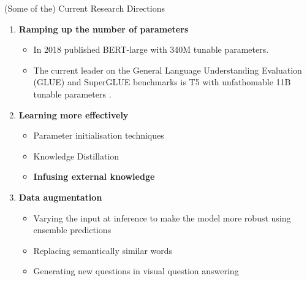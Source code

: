 \begin{frame}{(Some of the) Current Research Directions} 
\begin{enumerate}
    \item \textbf{Ramping up the number of parameters }
    \begin{itemize}
        \item In 2018 \cite{Devlin2018BERT:Understanding} published BERT-large with 340M tunable parameters. 
        \item The current leader on the General Language Understanding Evaluation (GLUE) and SuperGLUE benchmarks is T5 with unfathomable 11B tunable parameters \cite{Raffel2019ExploringTransformer}. 
    \end{itemize}
    \item \textbf{Learning more effectively}
    \begin{itemize}
        \item Parameter initialisation techniques \cite{Frankle2018TheNetworks, Yu2019PlayingNLP}
        \item Knowledge Distillation \cite{Sanh2019DistilBERTLighter}
        \item \textcolor{DTU_red}{\textbf{Infusing external knowledge}} \cite{Logan2019BaracksModeling, Hayashi2019LatentModels, Peters2019KnowledgeRepresentations}
    \end{itemize}
    \item \textbf{Data augmentation}
    \begin{itemize}
        \item Varying the input at inference to make the model more robust using ensemble predictions \cite{Jiang2019HowKnow}
        \item Replacing semantically similar words \cite{Wang2015ThatsTweets}
        \item Generating new questions in visual question answering \cite{Kafle2017DataAnswering}
    \end{itemize}
\end{enumerate}
\end{frame}


